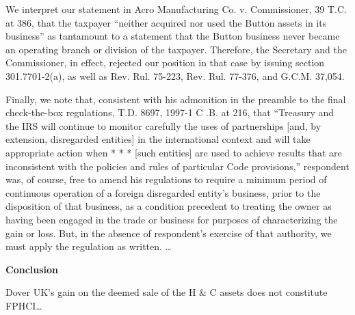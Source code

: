 \begin{select}
We interpret our statement in Acro Manufacturing Co. v. Commissioner, 39 T.C. at 386, that the taxpayer ``neither acquired nor used the Button assets in its business'' as tantamount to a statement that the Button business never became an operating branch or division of the taxpayer. Therefore, the Secretary and the Commissioner, in effect, rejected our position in that case by issuing section 301.7701-2(a), as well as Rev. Rul. 75-223, Rev. Rul. 77-376, and G.C.M. 37,054.

Finally, we note that, consistent with his admonition in the preamble to the final check-the-box regulations, T.D. 8697, 1997-1 C .B. at 216, that ``Treasury and the IRS will continue to monitor carefully the uses of partnerships [and, by extension, disregarded entities] in the international context and will take appropriate action when * * * [such entities] are used to achieve results that are inconsistent with the policies and rules of particular Code provisions,'' respondent was, of course, free to amend his regulations to require a minimum period of continuous operation of a foreign disregarded entity's business, prior to the disposition of that business, as a condition precedent to treating the owner as having been engaged in the trade or business for purposes of characterizing the gain or loss. But, in the absence of respondent's exercise of that authority, we must apply the regulation as written. \ldots 
\begin{center}
\textbf{Conclusion}\\
\end{center}
Dover UK's gain on the deemed sale of the H \& C assets does not constitute FPHCI\ldots
\end{select}

